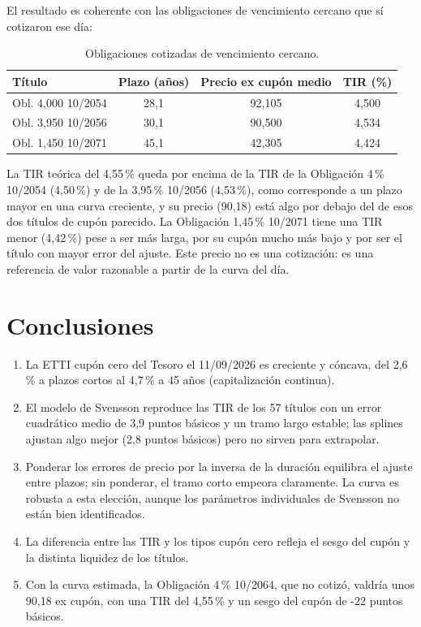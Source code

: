 \documentclass[a4paper,12pt]{article}
\begin{document}
El resultado es coherente con las obligaciones de vencimiento cercano que sí cotizaron ese día:
\begin{table}[H]\centering\caption{Obligaciones cotizadas de vencimiento cercano.}\label{tab:vecinos}
\begin{tabular}{lccc}\toprule Título & Plazo (años) & Precio ex cupón medio & TIR (\%)\\\midrule
Obl. 4,000 10/2054 & 28{,}1 & 92{,}105 & 4{,}500 \\
Obl. 3,950 10/2056 & 30{,}1 & 90{,}500 & 4{,}534 \\
Obl. 1,450 10/2071 & 45{,}1 & 42{,}305 & 4{,}424 \\
\bottomrule\end{tabular}\end{table}
La TIR teórica del 4{,}55\,\% queda por encima de la TIR de la Obligación 4\,\% 10/2054 (4{,}50\,\%) y de la 3,95\,\% 10/2056 (4{,}53\,\%), como corresponde a un plazo mayor en una curva creciente, y su precio (90{,}18) está algo por debajo del de esos dos títulos de cupón parecido. La Obligación 1,45\,\% 10/2071 tiene una TIR menor (4{,}42\,\%) pese a ser más larga, por su cupón mucho más bajo y por ser el título con mayor error del ajuste. Este precio no es una cotización: es una referencia de valor razonable a partir de la curva del día.

\section{Conclusiones}
\begin{enumerate}
\item La ETTI cupón cero del Tesoro el 11/09/2026 es creciente y cóncava, del 2{,}6\,\% a plazos cortos al 4{,}7\,\% a 45 años (capitalización continua).
\item El modelo de Svensson reproduce las TIR de los 57 títulos con un error cuadrático medio de 3{,}9 puntos básicos y un tramo largo estable; las splines ajustan algo mejor (2{,}8 puntos básicos) pero no sirven para extrapolar.
\item Ponderar los errores de precio por la inversa de la duración equilibra el ajuste entre plazos; sin ponderar, el tramo corto empeora claramente. La curva es robusta a esta elección, aunque los parámetros individuales de Svensson no están bien identificados.
\item La diferencia entre las TIR y los tipos cupón cero refleja el sesgo del cupón y la distinta liquidez de los títulos.
\item Con la curva estimada, la Obligación 4\,\% 10/2064, que no cotizó, valdría unos 90{,}18 ex cupón, con una TIR del 4{,}55\,\% y un sesgo del cupón de -22 puntos básicos.
\end{enumerate}
\end{document}
